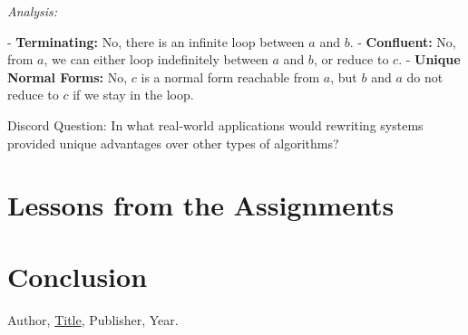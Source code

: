 \documentclass{article}
\theoremstyle{theorem}
\theoremstyle{definition}
\theoremstyle{remark}
\begin{document}
\textit{Analysis:}

- \textbf{Terminating:} No, there is an infinite loop between \( a \) and \( b \).
- \textbf{Confluent:} No, from \( a \), we can either loop indefinitely between \( a \) and \( b \), or reduce to \( c \).
- \textbf{Unique Normal Forms:} No, \( c \) is a normal form reachable from \( a \), but \( b \) and \( a \) do not reduce to \( c \) if we stay in the loop.

Discord Question: In what real-world applications would rewriting systems provided unique advantages over other types of algorithms?

\section{Lessons from the Assignments}


\section{Conclusion}\label{conclusion}


\begin{thebibliography}{99}
 Author, \href{https://en.wikipedia.org/wiki/LaTeX}{Title}, Publisher, Year.
\end{thebibliography}
\end{document}
